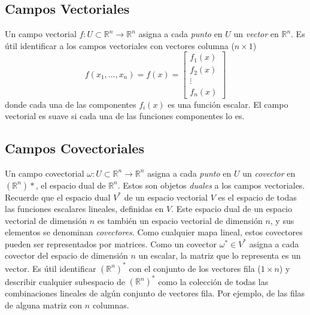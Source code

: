\subsection{Campos Vectoriales}
Un campo vectorial $f: U \subset \mathbb{R}^n \rightarrow \mathbb{R}^n$ asigna a cada \textit{punto} en $U$ un \textit{vector} en $\mathbb{R}^n$. Es útil identificar a los campos vectoriales con vectores columna ($n\times 1$)
\begin{equation*}
	f(x_1, \ldots, x_n) = f(x) = \begin{bmatrix}
		f_1(x) \\
		f_2(x) \\
		\vdots \\
		f_n(x)
	\end{bmatrix}
\end{equation*}
donde cada una de las componentes $f_i(x)$ es una función escalar. El campo vectorial es suave si cada una de las funciones componentes lo es.

\subsection{Campos Covectoriales}
Un campo covectorial $\omega: U \subset \mathbb{R}^n \rightarrow \mathbb{R}^n$ asigna a cada \textit{punto} en $U$ un \textit{covector} en $(\mathbb{R}^n)*$, el espacio dual de $\mathbb{R}^n$. Estos son objetos \textit{duales} a los campos vectoriales.\\

Recuerde que el espacio dual $V^*$ de un espacio vectorial $V$ es el espacio de todas las funciones escalares lineales, definidas en $V$. Este espacio dual de un espacio vectorial de dimensión $n$ es también un espacio vectorial de dimensión $n$, y sus elementos se denominan \textit{covectores}. Como cualquier mapa lineal, estos covectores pueden ser representados por matrices. Como un covector $\omega^* \in V^*$ asigna a cada covector del espacio de dimensión $n$ un escalar, la matriz que lo representa es un vector. Es útil identificar $(\mathbb{R}^n)^*$ con el conjunto de los vectores fila ($1\times n$) y describir cualquier subespacio de $(\mathbb{R}^n)^*$ como la colección de todas las combinaciones lineales de algún conjunto de vectores fila. Por ejemplo, de las filas de alguna matriz con $n$ columnas.\\

